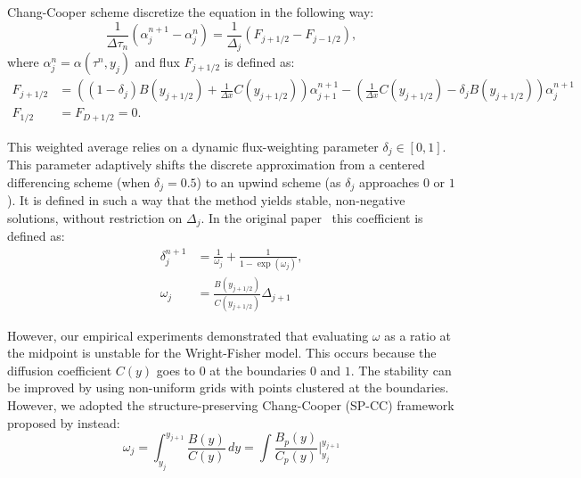 \documentclass{article}
\begin{document}
\bigskip

Chang-Cooper scheme discretize the equation in the following way:
\begin{equation}\label{eq:cc_discretization}
\frac{1}{\Delta \tau_n} \left(\alpha^{n+1}_j - \alpha^n_j\right) = \frac{1}{\Delta_j}\left(F_{j+1/2} -F_{j-1/2}\right),
\end{equation}
where $\alpha^n_j = \alpha(\tau^n, y_j)$ and flux $F_{j+1/2}$ is defined as:
\begin{equation}
    \label{eq:cc_flux}
    \begin{split}
    F_{j+1/2} &= \left((1-\delta_j)B(y_{j+1/2}) + \frac{1}{\Delta x}C(y_{j+1/2})\right) \alpha^{n+1}_{j+1} - \left(\frac{1}{\Delta x}C(y_{j+1/2}) - \delta_j B(y_{j+1/2}) \right) \alpha^{n+1}_{j} \\
    F_{1/2} &= F_{D+1/2} = 0.
    \end{split}
\end{equation}

This weighted average relies on a dynamic flux-weighting parameter $ \delta_j \in [0,1] $.
This parameter adaptively shifts the discrete approximation from a centered differencing scheme (when $\delta_j = 0.5$) to an upwind scheme (as $\delta_j$ approaches $0$ or $1$).
It is defined in such a way that the method yields stable, non-negative solutions, without restriction on $\Delta_j$.
In the original paper~\citet{chang1970} this coefficient is defined as:
\begin{equation*}
    \begin{split}
    \delta^{n+1}_j &= \frac{1}{\omega_j} + \frac{1}{1 - \exp(\omega_j)}, \\
    \omega_j &= \frac{B(y_{j+1/2})}{C(y_{j+1/2})} \Delta_{j+1}
    \end{split}
\end{equation*}

However, our empirical experiments demonstrated that evaluating $\omega$ as a ratio at the midpoint is unstable for the Wright-Fisher model.
This occurs because the diffusion coefficient $C(y)$ goes to 0 at the boundaries $0$ and $1$.
The stability can be improved by using non-uniform grids with points clustered at the boundaries.
However, we adopted the structure-preserving Chang-Cooper (SP-CC) framework proposed by \citet{pareschi2018} instead:
\begin{equation}\label{eq:omega}
\omega_j = \int_{y_j}^{y_{j+1}} \frac{B(y)}{C(y)} \, dy = \int \frac{B_p(y)}{C_p(y)} \Biggr\rvert_{y_{j}}^{y_{j+1}}
\end{equation}
\end{document}
